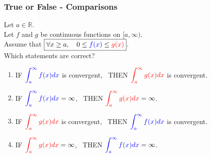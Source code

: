 \documentclass[14pt]{beamer}
\newcommand{\R}{\mathbb{R}}
\newcommand{\azul}[1]{{\color{blue} #1}}
\newcommand{\rojo}[1]{{\color{red} #1}}
\newcommand{\setsize}[1]{\fontsize{#1}{#1}\selectfont} %
\begin{document}
	\begin{frame}[t]
		\setsize{11}
		\frametitle{True or False - Comparisons}

		Let $a \in \R$. \\ Let $f$ and $g$ be continuous functions on $[a, \infty)$.
		\\ Assume that ${\displaystyle \boxed{\forall x \geq a, \quad 0 \leq \azul{f(x)} \leq \rojo{g(x)}}}$.
		\\ Which statements are correct?

		\begin{enumerate}
			\item IF ${\displaystyle \azul{\int_a^{\infty} f(x) dx}}$ is convergent,
				\, THEN ${\displaystyle \rojo{\int_a^{\infty} g(x) dx}}$ is convergent.

			\item IF ${\displaystyle \azul{\int_a^{\infty} f(x) dx} = \infty}$, \,
				THEN ${\displaystyle \rojo{\int_a^{\infty} g(x) dx} = \infty}$.

			\item IF ${\displaystyle \rojo{\int_a^{\infty} g(x) dx}}$ is convergent,
				\, THEN ${\displaystyle \azul{\int_a^{\infty} f(x) dx}}$ is convergent.

			\item IF ${\displaystyle \rojo{\int_a^{\infty} g(x) dx} = \infty}$, \,
				THEN ${\displaystyle \azul{\int_a^{\infty} f(x) dx} = \infty}$.
		\end{enumerate}
	\end{frame}
\end{document}
